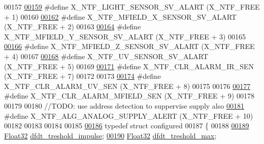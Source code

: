 \begin{DoxyCode}
00157 
\hypertarget{a00021_source_l00159}{}\hyperlink{a00021_a472c0187f61238cdef62bf3d965df8e2}{00159} \textcolor{preprocessor}{#define X\_NTF\_LIGHT\_SENSOR\_SV\_ALART                     (X\_NTF\_FREE + 1)}
00160 
\hypertarget{a00021_source_l00162}{}\hyperlink{a00021_a9d9558fb2155bafac3683d00b2a18b3f}{00162} \textcolor{preprocessor}{#define X\_NTF\_MFIELD\_X\_SENSOR\_SV\_ALART                      (X\_NTF\_FREE + 2)}
00163 
\hypertarget{a00021_source_l00164}{}\hyperlink{a00021_ad30200601c6761f2c9be1fd62df00421}{00164} \textcolor{preprocessor}{#define X\_NTF\_MFIELD\_Y\_SENSOR\_SV\_ALART                      (X\_NTF\_FREE + 3)}
00165 
\hypertarget{a00021_source_l00166}{}\hyperlink{a00021_aa1f79c63c45b8a4022e580c676d95627}{00166} \textcolor{preprocessor}{#define X\_NTF\_MFIELD\_Z\_SENSOR\_SV\_ALART                      (X\_NTF\_FREE + 4)}
00167 
\hypertarget{a00021_source_l00168}{}\hyperlink{a00021_a146527c519502db561ac17015bf9df5b}{00168} \textcolor{preprocessor}{#define X\_NTF\_UV\_SENSOR\_SV\_ALART                                    (X\_NTF\_FREE + 5)}
00169 
\hypertarget{a00021_source_l00171}{}\hyperlink{a00021_a55be0f14bd98010fdd4ff546f8cffefd}{00171} \textcolor{preprocessor}{#define X\_NTF\_CLR\_ALARM\_IR\_SEN                                      (X\_NTF\_FREE + 7)}
00172 
00173 
\hypertarget{a00021_source_l00174}{}\hyperlink{a00021_a1127762abb3a1aeb79d23421b2f00493}{00174} \textcolor{preprocessor}{#define X\_NTF\_CLR\_ALARM\_UV\_SEN                                      (X\_NTF\_FREE + 8)}
00175 
00176 
\hypertarget{a00021_source_l00177}{}\hyperlink{a00021_af3da43bd9d885f9c2a69ece8f997891b}{00177} \textcolor{preprocessor}{#define X\_NTF\_CLR\_ALARM\_MFIELD\_SEN                                  (X\_NTF\_FREE + 9)}
00178 
00179 
00180 \textcolor{comment}{//TODO: use address detection to suppervise supply also}
\hypertarget{a00021_source_l00181}{}\hyperlink{a00021_a5c8025c00c22190bf4b4c4fe87123f55}{00181} \textcolor{preprocessor}{#define X\_NTF\_ALG\_ANALOG\_SUPPLY\_ALERT                               (X\_NTF\_FREE + 10)}
00182 
00183 
00184 
00185 
\hypertarget{a00021_source_l00186}{}\hyperlink{a00021}{00186}  \textcolor{keyword}{typedef} \textcolor{keyword}{struct }configured
00187  \{
00188 
\hypertarget{a00021_source_l00189}{}\hyperlink{a00021_a3b9c683370c94430a4c6a9d78ce6f5ef}{00189}         \hyperlink{a00072_a87d38f886e617ced2698fc55afa07637}{Float32}                         \hyperlink{a00021_a3b9c683370c94430a4c6a9d78ce6f5ef}{dfdt\_treshold\_impulse};
\hypertarget{a00021_source_l00190}{}\hyperlink{a00021_adf9a37828e447378b1d533185213316d}{00190}         \hyperlink{a00072_a87d38f886e617ced2698fc55afa07637}{Float32}                         \hyperlink{a00021_adf9a37828e447378b1d533185213316d}{dfdt\_treshold\_max};

\end{DoxyCode}
